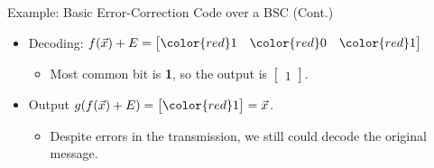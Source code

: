 \documentclass[aspectratio=169]{beamer}
\newcommand{\re}{\color{red}}
\begin{document}
\begin{frame}{Example: Basic Error-Correction Code over a BSC (Cont.)}
  \begin{itemize}
  \item Decoding: \( f(\vec{x}) + E =\begin{bmatrix}\re1 & \re0 & \re1 \end{bmatrix}\)
          \begin{itemize}
                \item Most common bit is \textbf{1}, so the output is \(\begin{bmatrix} 1 \end{bmatrix}\).
                  \end{itemize}
    \item Output \(g(f(\vec{x}) + E) = \begin{bmatrix}\re1\end{bmatrix} = \vec{x}\).
          \begin{itemize}
                  \item Despite errors in the transmission, we still could decode the original message.
                  \end{itemize}
          \end{itemize}
  \end{frame}
\end{document}
